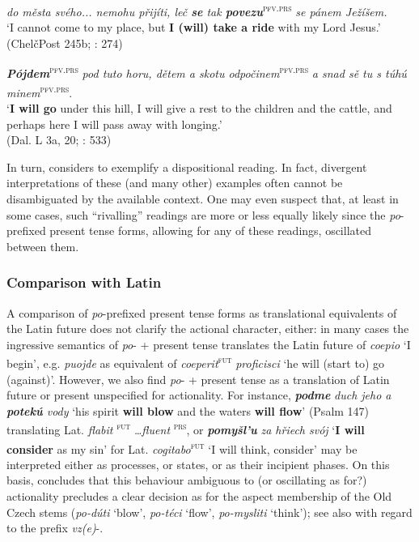 \documentclass[output=paper,colorlinks,citecolor=brown]{langscibook}
\begin{document}
\ea \label{ex:wiemer:32} 
    \textit{do města svého... nemohu přijíti, leč \textbf{se} tak \textbf{povezu}}\textsuperscript{\textsc{pfv.prs}} \textit{se pánem Ježíšem.}\\
    ‘I cannot come to my place, but \textbf{I (will) take a ride} with my Lord Jesus.’\\
    \hfill (ChelčPost 245b; \citealt{Němec2009b}: 274)
\z

\ea \label{ex:wiemer:33} 
    \textit{\textbf{Pójdem}}\textsuperscript{\textsc{pfv.prs}} \textit{pod tuto horu, dětem a skotu odpočinem}\textsuperscript{\textsc{pfv.prs}} \textit{a snad sě tu s túhú minem}\textsuperscript{\textsc{pfv.prs}}.\\
    ‘\textbf{I will go} under this hill, I will give a rest to the children and the cattle, and perhaps here I will pass away with longing.’\\
    \hfill (Dal. L 3a, 20; \citealt{Bondarko1961}: 533)
\z

In turn, \citet[440, fn. \ref{fn:14}]{Machek1962} considers  to exemplify a dispositional reading. In fact, divergent interpretations of these (and many other) examples often cannot be disambiguated by the available context. One may even suspect that, at least in some cases, such “rivalling” readings are more or less equally likely since the \textit{po}-prefixed present tense forms, allowing for any of these readings, oscillated between them.

\subsubsection{Comparison with Latin} \label{sec:wiemer:4.2.1}

A comparison of \textit{po}-prefixed present tense forms as translational equivalents of the Latin future does not clarify the actional character, either: in many cases the ingressive semantics of \textit{po}- + present tense translates the Latin future of \textit{coepio} ‘I begin’, e.g. \textit{puojde} as equivalent of \textit{coeperit}\textsuperscript{\textsc{fut}}\textit{ proficisci} ‘he will (start to) go (against)’. However, we also find \textit{po}- + present tense as a translation of Latin future or present unspecified for actionality. For instance, \textbf{\textit{podme}}\textit{ duch jeho a \textbf{potekú} vody} ‘his spirit \textbf{will blow} and the waters \textbf{will flow}’ (Psalm 147) translating Lat. \textit{flabit}\textsuperscript{ \textsc{fut}}\textit{ …fluent}\textsuperscript{ \textsc{prs}}, or \textbf{\textit{pomyšl’u}}\textit{ za hřiech svój} ‘\textbf{I will consider }as my sin’ for Lat. \textit{cogitabo}\textsuperscript{\textsc{fut}} ‘I will think, consider’ may be interpreted either as processes, or states, or as their incipient phases. On this basis, \citet[78--79]{Šlosar1981} concludes that this behaviour ambiguous to (or oscillating as for?) actionality precludes a clear decision as for the aspect membership of the Old Czech stems (\textit{po-dúti} ‘blow’, \textit{po-téci} ‘flow’, \textit{po-mysliti} ‘think’); see also \citet[102]{Šlosar1981} with regard to the prefix \textit{vz(e)}-.
\end{document}
